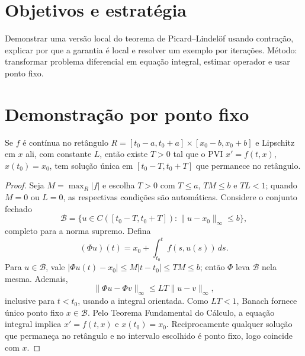 \documentclass[11pt,a4paper]{article}
\begin{document}
\section{Objetivos e estratégia}
Demonstrar uma versão local do teorema de Picard--Lindelöf usando contração, explicar por que a garantia é local e resolver um exemplo por iterações. Método: transformar problema diferencial em equação integral, estimar operador e usar ponto fixo.
\section{Demonstração por ponto fixo}
\begin{teorema}
Se $f$ é contínua no retângulo $R=[t_0-a,t_0+a]\times[x_0-b,x_0+b]$ e Lipschitz em $x$ ali, com constante $L$, então existe $T>0$ tal que o PVI $x'=f(t,x)$, $x(t_0)=x_0$, tem solução única em $[t_0-T,t_0+T]$ que permanece no retângulo.
\end{teorema}
\begin{proof}
Seja $M=\max_R|f|$ e escolha $T>0$ com $T\le a$, $TM\le b$ e $TL<1$; quando $M=0$ ou $L=0$, as respectivas condições são automáticas. Considere o conjunto fechado
\[
\mathcal B=\{u\in C([t_0-T,t_0+T]):\|u-x_0\|_\infty\le b\},
\]
completo para a norma supremo. Defina
\[
(\Phi u)(t)=x_0+\int_{t_0}^t f(s,u(s))\,ds.
\]
Para $u\in\mathcal B$, vale $|\Phi u(t)-x_0|\le M|t-t_0|\le TM\le b$; então $\Phi$ leva $\mathcal B$ nela mesma. Ademais,
\[
\|\Phi u-\Phi v\|_\infty
\le LT\|u-v\|_\infty,
\]
inclusive para $t<t_0$, usando a integral orientada. Como $LT<1$, Banach fornece único ponto fixo $x\in\mathcal B$. Pelo Teorema Fundamental do Cálculo, a equação integral implica $x'=f(t,x)$ e $x(t_0)=x_0$. Reciprocamente qualquer solução que permaneça no retângulo e no intervalo escolhido é ponto fixo, logo coincide com $x$.
\end{proof}
\end{document}
